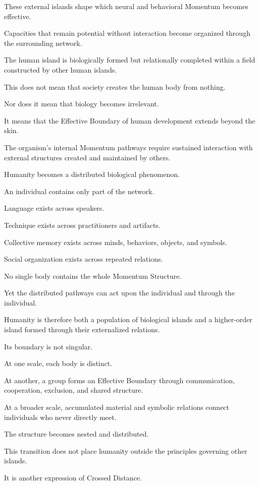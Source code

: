 These external islands shape which neural and behavioral Momentum becomes effective.

Capacities that remain potential without interaction become organized through the surrounding network.

The human island is biologically formed but relationally completed within a field constructed by other human islands.

This does not mean that society creates the human body from nothing.

Nor does it mean that biology becomes irrelevant.

It means that the Effective Boundary of human development extends beyond the skin.

The organism’s internal Momentum pathways require sustained interaction with external structures created and maintained by others.

Humanity becomes a distributed biological phenomenon.

An individual contains only part of the network.

Language exists across speakers.

Technique exists across practitioners and artifacts.

Collective memory exists across minds, behaviors, objects, and symbols.

Social organization exists across repeated relations.

No single body contains the whole Momentum Structure.

Yet the distributed pathways can act upon the individual and through the individual.

Humanity is therefore both a population of biological islands and a higher-order island formed through their externalized relations.

Its boundary is not singular.

At one scale, each body is distinct.

At another, a group forms an Effective Boundary through communication, cooperation, exclusion, and shared structure.

At a broader scale, accumulated material and symbolic relations connect individuals who never directly meet.

The structure becomes nested and distributed.

This transition does not place humanity outside the principles governing other islands.

It is another expression of Crossed Distance.

